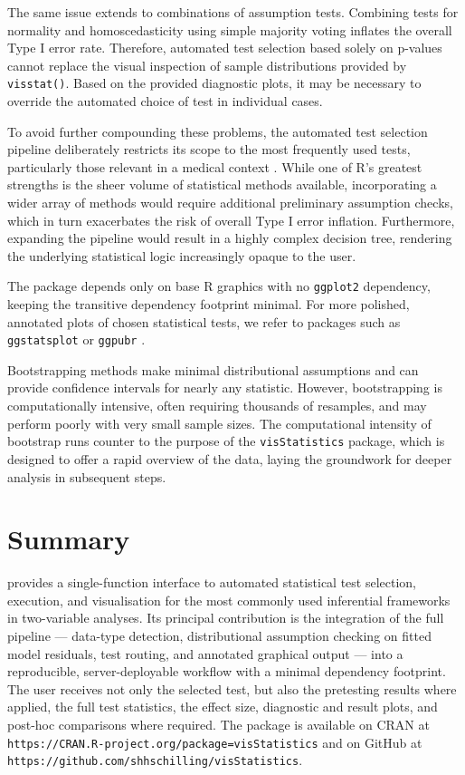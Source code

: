 The same issue extends to combinations of assumption tests. Combining
tests for normality and homoscedasticity using simple majority voting
inflates the overall Type I error rate. Therefore, automated test
selection based solely on p-values cannot replace the visual inspection
of sample distributions provided by \texttt{visstat()}. Based on the provided
diagnostic plots, it may be necessary to override the automated choice
of test in individual cases.

To avoid further compounding these problems, the automated test
selection pipeline deliberately restricts its scope to the most
frequently used tests, particularly those relevant in a medical context
\citep[\citet{Sato:2017},\citet{Chicco:2025}]{Strasak:2007}. While one of R's greatest
strengths is the sheer volume of statistical methods available,
incorporating a wider array of methods would require additional
preliminary assumption checks, which in turn exacerbates the risk of
overall Type I error inflation. Furthermore, expanding the pipeline
would result in a highly complex decision tree, rendering the underlying
statistical logic increasingly opaque to the user.

The package depends only on base R graphics with no \texttt{ggplot2}
\citep{Wickham:2016} dependency, keeping the transitive dependency footprint
minimal. For more polished, annotated plots of chosen statistical tests,
we refer to packages such as \texttt{ggstatsplot} \citep{Patil:2021} or \texttt{ggpubr}
\citep{Kassambara:2026}.

Bootstrapping methods \citep{Wilcox:2021} make minimal distributional
assumptions and can provide confidence intervals for nearly any
statistic. However, bootstrapping is computationally intensive, often
requiring thousands of resamples, and may perform poorly with very small
sample sizes. The computational intensity of bootstrap runs counter to
the purpose of the \texttt{visStatistics} package, which is designed to offer a
rapid overview of the data, laying the groundwork for deeper analysis in
subsequent steps.

\section{Summary}\label{summary}

 provides a single-function interface to
automated statistical test selection, execution, and visualisation for
the most commonly used inferential frameworks in two-variable analyses.
Its principal contribution is the integration of the full pipeline ---
data-type detection, distributional assumption checking on fitted model
residuals, test routing, and annotated graphical output --- into a
reproducible, server-deployable workflow with a minimal dependency
footprint. The user receives not only the selected test, but also the
pretesting results where applied, the full test statistics, the effect
size, diagnostic and result plots, and post-hoc comparisons where
required. The package is available on CRAN at
\texttt{https://CRAN.R-project.org/package=visStatistics} and on GitHub at
\texttt{https://github.com/shhschilling/visStatistics}.

